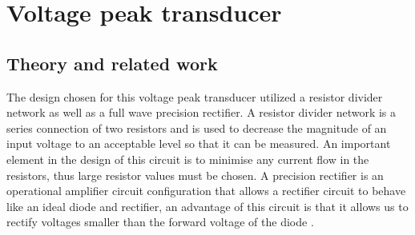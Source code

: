 \chapter{Voltage peak transducer}
\section{Theory and related work} \label{sec:literature_voltage_peak_transducer}
The design chosen for this voltage peak transducer utilized a resistor divider network as well as a full wave precision rectifier. A resistor divider network is a series connection of two resistors and is used to decrease the magnitude of an input voltage to an acceptable level so that it can be measured. An important element in the design of this circuit is to minimise any current flow in the resistors, thus large resistor values must be chosen. A precision rectifier is an operational amplifier circuit configuration that allows a rectifier circuit to behave like an ideal diode and rectifier, an advantage of this circuit is that it allows us to rectify voltages smaller than the forward voltage of the diode \cite{PrecisionRectifier}.

